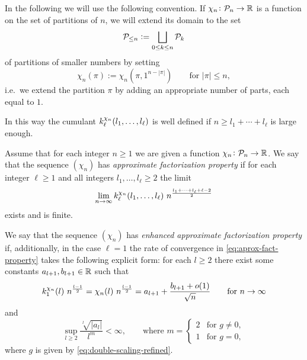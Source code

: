 \documentclass[12pt,usenames,dvipsnames,svgnames,table]{amsart}
\begin{document}
In the following we will use the following convention.
If $\chi_n\colon\mathcal{P}_{n}\to\mathbb{R}$ is a function on the set of partitions of $n$, 
we will extend its domain to 
the set 
\[ \mathcal{P}_{\leq n}:=\bigsqcup_{0\leq k\leq n} \mathcal{P}_{k} \] 
of partitions of smaller numbers 
by setting
\begin{equation}
\label{eq:extended-character}
\chi_n(\pi):= \chi_n( \pi,1^{n-|\pi|}) \qquad \text{for } |\pi|\leq n,    
\end{equation}
i.e.~we extend the partition $\pi$ by adding an appropriate number of parts, each equal to $1$.

In this way the cumulant
$k^{\chi_n}_\ell (l_1,\dots,l_\ell)$ 
is well defined if $n\geq l_1+\cdots+l_\ell$
is large enough.

\begin{definition} 
	\label{def:approx-factorization-charactersA}
	Assume that for each integer $n\geq 1$ we are given a function $\chi_n\colon\mathcal{P}_{n}\to\mathbb{R}$.
	We say that the sequence $(\chi_n)$ has \emph{approximate factorization property} 
	\cite{Sniady2006c} if
	for each integer $\ell\geq 1$ and all integers $l_1,\dots,l_\ell\geq 2$ the limit
	\begin{equation}
	\label{eq:aprox-fact-property}
	\lim_{n\to\infty} k^{\chi_n}_\ell (l_1,\dots,l_\ell)\ n^{\frac{l_1+\cdots+l_\ell+\ell-2}{2}} 
	\end{equation}
	exists and is finite.
	
	\smallskip
	
	We say that the sequence $(\chi_n)$ has \emph{enhanced approximate factorization property}
	if, additionally, in the case $\ell=1$  
	the rate of convergence in \eqref{eq:aprox-fact-property}
	takes the following explicit form:
	for each $l\geq 2$ there exist some constants $a_{l+1},b_{l+1}\in\mathbb{R}$ such that
	\begin{equation}
	\label{eq:refined-asymptotics-characters}
	k^{\chi_n}_1(l) \ n^{\frac{l-1}{2}} =  \chi_n(l) \ n^{\frac{l-1}{2}}  =
	a_{l+1}+ \frac{b_{l+1}+o(1)}{\sqrt{n}} \qquad \text{for }n\to\infty   
	\end{equation}
	and 
	\begin{equation}
	\label{eq:what-is-m}
	\sup_{l\geq 2} \frac{\sqrt[l]{|a_l|}}{l^m} < \infty,
	\qquad
	\text{where }
	m = \begin{cases}2 &\text{for } g \neq 0,\\
	1 & \text{for } g=0,\end{cases}  
	\end{equation}
	where $g$ is given by \eqref{eq:double-scaling-refined}.
\end{definition}
\end{document}
